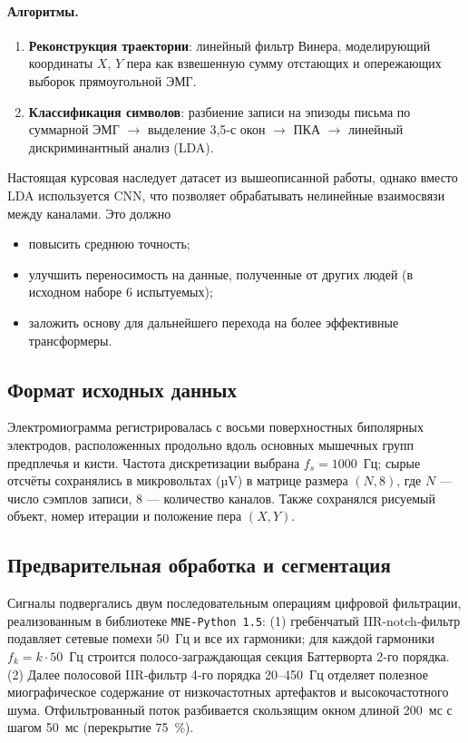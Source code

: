 \documentclass[a4paper,12pt]{article}
\begin{document}
\paragraph{Алгоритмы.}
\begin{enumerate}
    \item \textbf{Реконструкция траектории}: линейный фильтр Винера, моделирующий координаты $X,\,Y$ пера как взвешенную сумму отстающих и опережающих выборок прямоугольной ЭМГ.
    \item \textbf{Классификация символов}: разбиение записи на эпизоды письма по суммарной ЭМГ $\rightarrow$ выделение 3{,}5‑с окон $\rightarrow$ ПКА $\rightarrow$ линейный дискриминантный анализ (LDA).
\end{enumerate}

Настоящая курсовая наследует датасет из вышеописанной работы, однако вместо LDA используется CNN, что позволяет обрабатывать нелинейные взаимосвязи между каналами. Это должно
\begin{itemize}
    \item повысить среднюю точность;
    \item улучшить переносимость на данные, полученные от других людей (в исходном наборе 6 испытуемых);
    \item заложить основу для дальнейшего перехода на более эффективные трансформеры.
\end{itemize}

\subsection{Формат исходных данных}
Электромиограмма регистрировалась с восьми поверхностных биполярных электродов, расположенных продольно вдоль основных мышечных групп предплечья и кисти. Частота дискретизации выбрана $f_{\!s}=1000$~Гц; сырые отсчёты сохранялись в микровольтах (µV) в матрице размера $(N,8)$, где $N$ — число сэмплов записи, 8 — количество каналов. Также сохранялся рисуемый объект, номер итерации и положение пера $(X, Y)$.

\subsection{Предварительная обработка и сегментация}
Сигналы подвергались двум последовательным операциям цифровой фильтрации, реализованным в библиотеке \texttt{MNE‑Python 1.5}: (1) гребёнчатый IIR‑notch‑фильтр подавляет сетевые помехи 50 Гц и все их гармоники; для каждой гармоники $f_k = k\cdot50$ Гц строится полосо‑заграждающая секция Баттерворта 2‑го порядка. (2) Далее полосовой IIR‑фильтр 4‑го порядка 20–450 Гц отделяет полезное миографическое содержание от низкочастотных артефактов и высокочастотного шума. Отфильтрованный поток разбивается скользящим окном длиной 200 мс с шагом 50 мс (перекрытие 75~\%).
\end{document}
